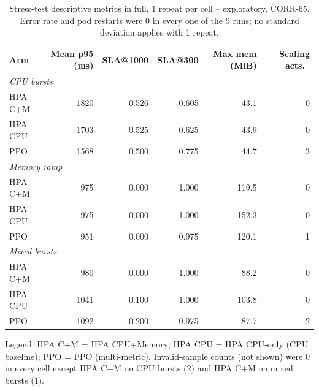 \begin{table}[H]
\centering
\caption[Stress test, full descriptive metrics]{Stress-test descriptive metrics in full, 1 repeat per cell -- exploratory, CORR-65. Error rate and pod restarts were 0 in every one of the 9 runs; no standard deviation applies with 1 repeat.}
\label{tab:stress-descriptive-appendix}
\small
\begin{tabular}{lrrrrr}
\toprule
Arm & Mean p95 (ms) & SLA@1000 & SLA@300 & Max mem (MiB) & Scaling acts.\ \\
\midrule
\multicolumn{6}{l}{\textit{CPU bursts}} \\
HPA C+M & 1820 & 0.526 & 0.605 & 43.1 & 0 \\
HPA CPU & 1703 & 0.525 & 0.625 & 43.9 & 0 \\
PPO & 1568 & 0.500 & 0.775 & 44.7 & 3 \\
\midrule
\multicolumn{6}{l}{\textit{Memory ramp}} \\
HPA C+M & 975 & 0.000 & 1.000 & 119.5 & 0 \\
HPA CPU & 975 & 0.000 & 1.000 & 152.3 & 0 \\
PPO & 951 & 0.000 & 0.975 & 120.1 & 1 \\
\midrule
\multicolumn{6}{l}{\textit{Mixed bursts}} \\
HPA C+M & 980 & 0.000 & 1.000 & 88.2 & 0 \\
HPA CPU & 1041 & 0.100 & 1.000 & 103.8 & 0 \\
PPO & 1092 & 0.200 & 0.975 & 87.7 & 2 \\
\bottomrule
\end{tabular}

\vspace{4pt}
\footnotesize Legend: HPA C+M = HPA CPU+Memory; HPA CPU = HPA CPU-only (CPU baseline); PPO = PPO (multi-metric). Invalid-sample counts (not shown) were 0 in every cell except HPA C+M on CPU bursts (2) and HPA C+M on mixed bursts (1).
\end{table}
